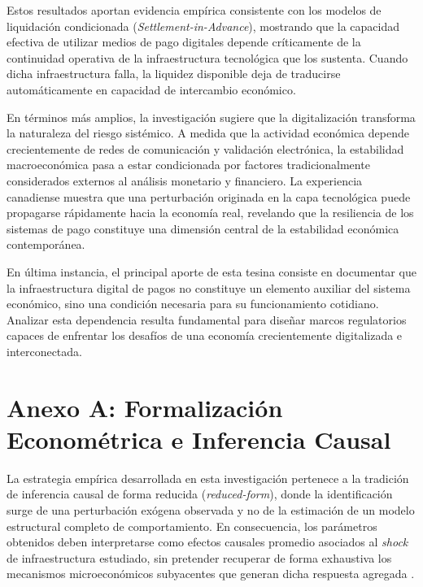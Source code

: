 Estos resultados aportan evidencia emp\'irica consistente con los modelos de liquidaci\'on condicionada (\textit{Settlement-in-Advance}), mostrando que la capacidad efectiva de utilizar medios de pago digitales depende cr\'iticamente de la continuidad operativa de la infraestructura tecnol\'ogica que los sustenta. Cuando dicha infraestructura falla, la liquidez disponible deja de traducirse autom\'aticamente en capacidad de intercambio econ\'omico.

En t\'erminos m\'as amplios, la investigaci\'on sugiere que la digitalizaci\'on transforma la naturaleza del riesgo sist\'emico. A medida que la actividad econ\'omica depende crecientemente de redes de comunicaci\'on y validaci\'on electr\'onica, la estabilidad macroecon\'omica pasa a estar condicionada por factores tradicionalmente considerados externos al an\'alisis monetario y financiero. La experiencia canadiense muestra que una perturbaci\'on originada en la capa tecnol\'ogica puede propagarse r\'apidamente hacia la econom\'ia real, revelando que la resiliencia de los sistemas de pago constituye una dimensi\'on central de la estabilidad econ\'omica contempor\'anea.

En \'ultima instancia, el principal aporte de esta tesina consiste en documentar que la infraestructura digital de pagos no constituye un elemento auxiliar del sistema econ\'omico, sino una condici\'on necesaria para su funcionamiento cotidiano. Analizar esta dependencia resulta fundamental para dise\~nar marcos regulatorios capaces de enfrentar los desaf\'ios de una econom\'ia crecientemente digitalizada e interconectada.

\newpage
\newpage
{}
\appendix
{}


\newpage
\section{Anexo A: Formalizaci\'on Econom\'etrica e Inferencia Causal}
\label{anx:anexo_a}

La estrategia emp\'irica desarrollada en esta investigaci\'on pertenece a la tradici\'on de inferencia causal de forma reducida (\textit{reduced-form}), donde la identificaci\'on surge de una perturbaci\'on ex\'ogena observada y no de la estimaci\'on de un modelo estructural completo de comportamiento. En consecuencia, los par\'ametros obtenidos deben interpretarse como efectos causales promedio asociados al \textit{shock} de infraestructura estudiado, sin pretender recuperar de forma exhaustiva los mecanismos microecon\'omicos subyacentes que generan dicha respuesta agregada \citep{angrist2009mostly, cunningham2021causal, heckman1989choosing}.

